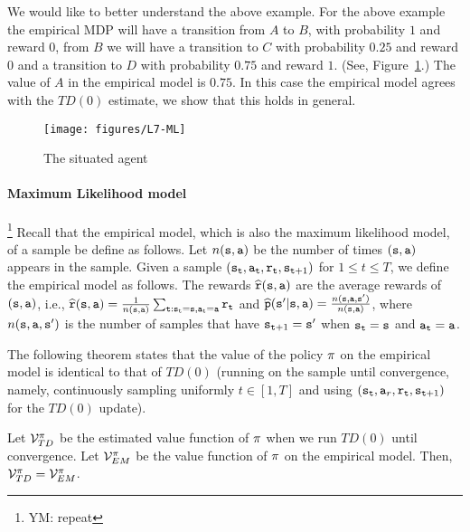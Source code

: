 We would like to better understand the above example. For the above
example the empirical MDP will have a transition from $A$ to $B$,
with probability $1$ and reward $0$, from $B$ we will have a
transition to $C$ with probability $0.25$ and reward $0$ and a
transition to $D$ with probability $0.75$ and reward $1$. (See,
Figure~\ref{fig:L7-ML}.) The value of $A$ in the empirical model is
$0.75$. In this case the empirical model agrees with the $TD(0)$
estimate, we show that this holds in general.


\begin{figure}
  \begin{centering}
  \texttt{[image: figures/L7-ML]}\\
  \caption{The situated agent}\label{fig:L7-ML}
  \end{centering}
\end{figure}


\paragraph{Maximum Likelihood model}\footnote{YM: repeat} Recall that the empirical model, which is also the
maximum likelihood model, of a sample be define as follows. Let
$n({\tt s},{\tt a})$ be the number of times $({\tt s},{\tt a})$
appears in the sample. Given a sample
$({\tt s}_{\tt t},{\tt a}_{\tt t},{\tt r}_{\tt t},{\tt s}_{{\tt t}+1})$
for $1\leq t\leq T$, we define the empirical model as follows. The
rewards $\widehat{{\tt r}}({\tt s},{\tt a})$ are the average rewards
of $({\tt s},{\tt a})$, i.e.,
$\widehat{{\tt r}}({\tt s},{\tt a})=\frac{1}{n({\tt s},{\tt a})}\sum_{{\tt t}:{\tt s}_{\tt t}={\tt s},{\tt a}_{\tt t}={\tt a}}{\tt r}_{\tt t}$
and
$\widehat{{\tt p}}({\tt s}'|{\tt s},{\tt a})=\frac{n({\tt s},{\tt a},{\tt s}')}{n({\tt s},{\tt a})}$,
where $n({\tt s},{\tt a},{\tt s}')$ is the number of samples that have
${\tt s}_{{\tt t}+1}={\tt s}'$ when ${\tt s}_{\tt t}={\tt s}$ and
${\tt a}_{\tt t} ={\tt a}$.

The following theorem states that the value of the policy $\pi$ on the
empirical model is identical to that of $TD(0)$ (running on the
sample until convergence, namely, continuously sampling uniformly
$t\in[1,T]$ and using $({\tt s}_{\tt t},
{\tt a}_r,{\tt r}_{\tt t},{\tt s}_{{\tt t}+1})$ for the $TD(0)$
update).

\begin{theorem}
Let $\mathcal{V}^\pi_{TD}$ be the estimated value function of
$\pi$ when we run $TD(0)$ until convergence. Let
$\mathcal{V}^\pi_{EM}$ be the value function of $\pi$ on the
empirical model. Then, $\mathcal{V}^\pi_{TD}=\mathcal{V}^\pi_{EM}$.
\end{theorem}

